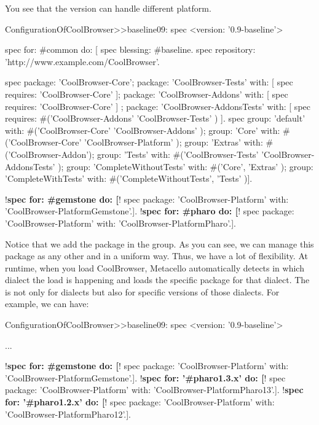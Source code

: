 \documentclass[a4paper,10pt,twoside]{book}
\begin{document}
You see that the version can handle different platform.


\begin{code}{}
ConfigurationOfCoolBrowser>>baseline09: spec 
       <version: '0.9-baseline'>
       
       spec for: #common do: [
              spec blessing: #baseline.
              spec repository: 'http://www.example.com/CoolBrowser'.
              
              spec 
                     package: 'CoolBrowser-Core';
                     package: 'CoolBrowser-Tests' with: [ spec requires: 'CoolBrowser-Core' ];
                     package: 'CoolBrowser-Addons' with: [ spec requires: 'CoolBrowser-Core' ] ;
                     package: 'CoolBrowser-AddonsTests' with: [ 
                            spec requires: #('CoolBrowser-Addons' 'CoolBrowser-Tests' ) ].
              spec 
                     group: 'default' with: #('CoolBrowser-Core' 'CoolBrowser-Addons' );
                     group: 'Core' with: #('CoolBrowser-Core' 'CoolBrowser-Platform' );
                     group: 'Extras' with: #('CoolBrowser-Addon');
                     group: 'Tests' with: #('CoolBrowser-Tests' 'CoolBrowser-AddonsTests' );
                     group: 'CompleteWithoutTests' with: #('Core', 'Extras' );
                     group: 'CompleteWithTests' with: #('CompleteWithoutTests', 'Tests' )].
                     
       !\textbf{spec for: \#gemstone do: [}!
              spec package: 'CoolBrowser-Platform' with: 'CoolBrowser-PlatformGemstone'.].
       !\textbf{spec for: \#pharo do: [}!
              spec package: 'CoolBrowser-Platform' with: 'CoolBrowser-PlatformPharo'.].
\end{code}

Notice that we add the package  in the  group. As you can see, we can manage this package as any other and in a uniform way. Thus, we have a lot of flexibility. At runtime, when you load CoolBrowser, Metacello automatically detects in which dialect the load is happening and loads the specific package for that dialect. The  is not only for dialects but also for specific versions of those dialects. For example, we can have:

\begin{code}{}
ConfigurationOfCoolBrowser>>baseline09: spec 
       <version: '0.9-baseline'>

       ...
                     
       !\textbf{spec for: \#gemstone do: [}!
              spec package: 'CoolBrowser-Platform' with: 'CoolBrowser-PlatformGemstone'.].
       !\textbf{spec for: '\#pharo1.3.x' do: [}!
              spec package: 'CoolBrowser-Platform' with: 'CoolBrowser-PlatformPharo13'.].          
       !\textbf{spec for: '\#pharo1.2.x' do: [}!
              spec package: 'CoolBrowser-Platform' with: 'CoolBrowser-PlatformPharo12'.].          
      
\end{code}
\end{document}
